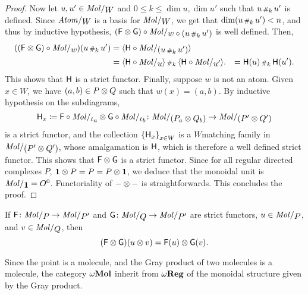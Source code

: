 \begin{proof}
    Now let \( u, u' \in \molecin{W} \) and \( 0 \le k \le \dim u, \dim u' \) such that \( u \,{\scriptstyle\#}_{k}\, u' \) is defined.
    Since \( \atomin{W} \) is a basis for \( \molecin{W} \), we get that \( \dim (u \,{\scriptstyle\#}_{k}\, u') < n \), and thus by inductive hypothesis, 
    \( (\F \gray \G)  \after \molecin{w \after (u \cp{k} u')} \) is well defined.
    Then,
    \begin{align*}
        ((\F \gray \G)  \after \molecin{w})(u \cp{k} u') &= \pcell{\fun{H} \after \molecin{(u \cp{k} u')}} \\
                                                         &= \pcell{\fun{H} \after \molecin{u}} \cp{k} \pcell{\fun{H} \after \molecin{u'}}.
                                                         &= \fun{H}(u) \cp{k} \fun{H}(u').
    \end{align*}
    This shows that \( \mathsf{H} \) is a strict functor.
    Finally, suppose \( w \) is not an atom.
    Given \( x \in W \), we have \( (a, b) \in P \otimes Q \) such that \( w(x) = (a, b) \).
    By inductive hypothesis on the subdiagrams, 
    \begin{equation*}
        \fun{H}_x \eqdef \F \after \molecin{\mapel{a}} \gray \G \after \molecin{\mapel{b}} \colon \molecin{(\imel{P}{a} \gray \imel{Q}{b})} \to \molecin{(P' \gray Q')}
    \end{equation*}
    is a strict functor, and the collection \( \left\{ {\mathsf{H}_x} \right\}_{x \in W} \) is a \( W \)\nbd matching family in \( \molecin{(P' \gray Q')} \), whose amalgamation is \( \mathsf{H} \), which is therefore a well defined strict functor.
    This shows that \( \mathsf{F} \otimes \mathsf{G} \) is a strict functor.
    Since for all regular directed complexes \( P \), \( \mathbf{1} \otimes P = P = P \otimes \mathbf{1} \), we deduce that the monoidal unit is \( \molecin{\pt} = \globe{0} \).
    Functoriality of \( - \otimes - \) is straightforwards.
    This concludes the proof.
\end{proof}

\begin{rmk}
    If \( \F \colon \molecin{P} \to \molecin{P'} \) and \( \G \colon \molecin{Q} \to \molecin{P'} \) are strict functors, \( u \in \molecin{P} \), and \( v \in \molecin{Q} \), then 
    \begin{equation*}
       (\mathsf{F} \otimes \mathsf{G})(u \otimes v) = \mathsf{F}(u) \otimes \mathsf{G}(v). 
    \end{equation*}
\end{rmk}

\begin{rmk}
    Since the point is a molecule, and the Gray product of two molecules is a molecule, the category \( \omega\mathbf{Mol} \) inherit from \( \omega\mathbf{Reg} \) of the monoidal structure given by the Gray product. 
\end{rmk}


